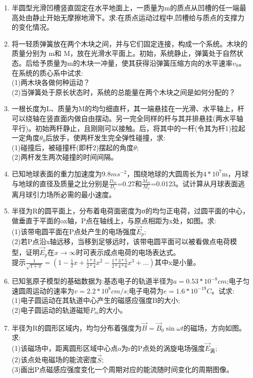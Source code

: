 \begin{enumerate}
\item 半圆型光滑凹槽竖直固定在水平地面上，一质量为m的质点从凹槽的任一端最高处由静止开始无摩擦地滑下。求:在质点运动过程中,凹槽给与质点的支撑力的变化情况。
\item 将一轻质弹簧放在两个木块之间，并与它们固定连接，构成一个系统。木块的质量分别为 m和 M，放在光滑水平面上。初始，系统静止，弹簧处于自然状态。后给予质量为m的木块一冲量，使其获得沿弹簧压缩方向的水平速率$v_0$。在系统的质心系中试求:\\
(1)两木块各做何种运动？\\
(2)当弹簧处于原长状态时，系统的总能量在两个木块之间是如何分配的？
\item 一根长度为L、质量为M的均匀细直杆，其一端悬挂在一光滑、水平轴上，杆可以绕轴在竖直面内做自由摆动。另一完全同样的杆与其并排悬挂(两水平轴平行)。初始两杆静止，且刚刚可以接触。后，将其中的一杆(令其为杆1)拉起一定角度$\theta_0$后放手，使两杆发生完全弹性碰撞，求:\\
(1)碰撞后，被碰撞杆(即杆2)摆起的角度$\theta$;\\
(2)两杆发生两次碰撞的时间间隔。
\item 已知地球表面的重力加速度为$9.8ms^{-2}$，围绕地球的大圆周长为$4*10^7$m，月球与地球的直径及质量之比分别是$\frac{D_m}{D_e}$=0.27和$\frac{M_m}{M_e}$=0.0123。试计算从月球表面逃离月球引力场所必需的最小速度。
\item 半径为R的圆平面上，分布着电荷面密度为σ的均匀正电荷，过圆平面的中心，做垂直于平面的ox轴，P点在轴线上，与原点相距为x处，如图。求:\\
(1)该带电圆平面在P点处产生的电场强度$\vec E_p$;\\
(2)若P点沿x轴远移，当移到足够远时，该带电圆平面可以被看做点电荷模型，证明$\vec E_p$在$x \to \infty$时可表示成点电荷的电场表达式。\\
提示$\displaystyle \frac{1}{\sqrt{1+x}}=(1-\frac{1}{2}x+\frac{1*3}{2*4}x^2-\frac{1*3*5}{2*4*6}x^3+\dots)$其中x是小量。
\item 已知氢原子模型的基础数据为:基态电子的轨道半径为$a=0.53*10^{-8}cm$;电子匀速圆周运动的速率为$v=2.2*10^8cm/s$;电子电荷为$e=1.6*10^{-19}C$。试求:\\
(1)电子圆运动在其轨道中心产生的磁感应强度B的大小;\\
(2)电子圆运动的轨道磁矩$P_m$的大小。
\item 半径为R的圆形区域内，均匀分布着强度为$\vec B=\vec B_0 \sin \omega t$的磁场，方向如图。求:\\
(1)该磁场中，距离圆形区域中心点o为r的P点处的涡旋电场强度$\vec E_\text{涡}$;\\
(2)该点处电磁场的能流密度$\vec S$;\\
(3)画出P点磁感应强度变化一个周期对应的能流随时间变化的周期图像。
\end{enumerate}
